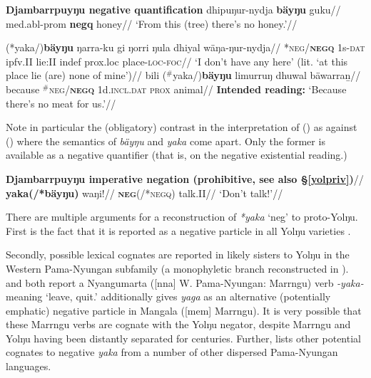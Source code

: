 {\pex{} \textbf{Djambarrpuyŋu negative quantification}
\a\begingl\gla dhipuŋur-nydja \textbf{bäyŋu} guku//
\glb \gls{med}.\gls{abl}-\gls{prom} \textbf{\gls{negq}} honey//
\glft`From this (tree) there's no honey.'//\endgl

\a\begingl
	\gla (*yaka/)\textbf{bäyŋu} ŋarra-ku gi ŋorri ŋula dhiyal wäŋa-ŋur-nydja//
	\glb \textsc{*neg/\textbf{negq}} 1\gls{s}\textsc{-dat} \gls{ipfv}.\gls{II} lie:\gls{II} \gls{indef} \gls{prox}.\gls{loc} place-\textsc{loc-foc}//
	\glft`I don't have any here' (lit. `at this place lie (are) none of mine')//
	\endgl
\a\begingl\gla bili ($^\#$yaka/)\textbf{bäyŋu} limurruŋ dhuwal bäwarraṉ//
\glb because \textsc{$^\#$neg/\textbf{negq}} 1\gls{d}.\textsc{incl.dat} \textsc{prox} animal//
\glft\textbf{Intended reading:} `Because there's no meat for us.'//\endgl{}
\xe

\noindent Note in particular the (obligatory) contrast in the interpretation of () as against () where the semantics of \textit{bäyŋu} and \textit{yaka} come apart. Only the former is available as a negative quantifier (that is, on the negative existential reading.)


\pex{}\begingl\glpreamble\textbf{Djambarrpuyŋu imperative negation (prohibitive, see also §\ref{yolpriv})}//
\gla \textbf{yaka(/*bäyŋu)} waŋi!//
\glb \textsc{\textbf{neg}(/*negq)} talk.\gls{II}//
\glft`Don't talk!'//\endgl\xe


There are multiple arguments for a reconstruction of \textit{*yaka} `\gls{neg}' to proto-Yolŋu. First is the fact that it is reported as a negative particle in all Yolŋu varieties \citep[31]{Schebeck2001}.

 Secondly, possible lexical cognates are reported in likely sisters to Yolŋu in the Western Pama-Nyungan subfamily (a monophyletic branch reconstructed in \citealt[838]{Bowern2012}). \citet[226]{Sharp2004} and \citet[67]{Ogrady1963} both report a Nyangumarta ([\gls{nna}] W. Pama-Nyungan: Marrngu) verb \textit{-yaka-} meaning `leave, quit.' \citet[35]{Mckelson1974} additionally gives \textit{yaga} as an alternative (potentially emphatic) negative particle in Mangala ([\gls{mem}] Marrngu). It is very possible that these Marrngu verbs are cognate with the Yolŋu negator, despite Marrngu and Yolŋu having been distantly separated for centuries. Further, \citet[85]{Dixon2002a} lists other potential cognates to negative \textit{yaka} from a number of other dispersed Pama-Nyungan languages.
 
}

